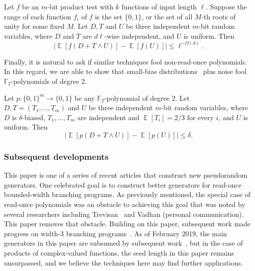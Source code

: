 \documentclass{toc}
\newcommand{\zo}{\{0,1\}}
\def\Blocklength{\ell}
\newcommand\F{\mathbb F}
\DeclareMathOperator*{\E}{\mathbb{E}}                 %
\begin{document}
\begin{theorem} \label{thm:bipnfp-strong}
  Let $f$ be an %
  $m$-bit %
  product test with $k$ functions of input length $\Blocklength$.
  Suppose the range of each function $f_i$ of $f$ is the set $\zo$, or the set of all $M$-th roots of unity for some fixed $M$.
  Let $D,T$ and $U$ be three independent $m$-bit random variables,  %
  where $D$ and $T$ are $d\Blocklength$-wise independent, and $U$ is uniform.  %
  Then
  \[
    \bigl| \E[ f(D + T \wedge U) ] - \E[ f(U) ] \bigr| \le \Blocklength^{-\Omega(d)} .
  \]
\end{theorem}

%

Finally, it is natural to ask if similar techniques fool non-read-once
polynomials.
In this regard, we are able to show that small-bias 
distributions~\cite{NaorN93} plus noise fool $\F_2$-polynomials of degree $2$.

\begin{claim} \label{claim:bipnf-deg2}
  Let $p\colon \zo^m \to \zo$ be any $\F_2$-polynomial of degree $2$.
  Let $D,T = (T_1, \ldots, T_m)$ and $U$ be three independent $m$-bit random variables, where $D$ is  %
  $\delta$-biased, $T_1, \dots, T_m$ are independent and $\E[T_i]=2/3$ for every $i$, and $U$ is uniform.  %
  Then 
  \[
    \bigl| \E[p(D + T \wedge U)] - \E[p(U)] \bigr| \le \delta .
  \]
\end{claim}

\subsubsection{Subsequent developments}  %
This paper is one of a series of recent %
articles  %
that construct new pseudorandom generators.  One celebrated goal is to construct better generators for read-once bounded-width branching programs.
As previously mentioned, the special case of read-once polynomials was an
obstacle to achieving this goal that was noted by several researchers
including Trevisan~\cite{Trevisan10-openproblems} and Vadhan (personal
communication).  This paper %
removes that obstacle.  %
Building on this paper, subsequent work made progress on width-3 
branching programs~\cite{MekaRT19}.
As of February 2019, the main generators in this paper are subsumed by
subsequent %
work~\cite{MekaRT19,Lee19},  %
but in the case of products of complex-valued functions, the seed length in this paper remains unsurpassed, and we believe the techniques here may find further applications.
\end{document}
